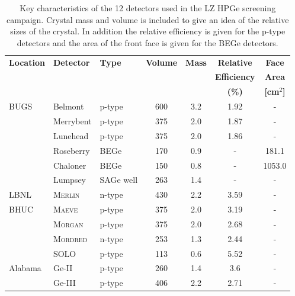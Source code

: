 \begin{table}[h]
\centering
\caption{Key characteristics of the 12 detectors used in the LZ HPGe screening campaign. Crystal mass and volume is included to give an idea of the relative sizes of the crystal. In addition the relative efficiency is given for the p-type detectors and the area of the front face is given for the BEGe detectors.}
    \label{tab:GeDetInf}
    \vspace{1mm}
    \renewcommand{\arraystretch}{1.1}
    \begin{tabular}{ lllcccc }
    \multirow{3}{*}{\textbf{Location}} & %
    \multirow{3}{*}{\textbf{Detector}} & %
    \multirow{3}{*}{\textbf{Type}} & %
    \multirow{2}{*}{\textbf{Volume}} & %
    \multirow{2}{*}{\textbf{Mass}} & %
    \textbf{Relative} & %
    \textbf{Face} %
    \\
    &
    & %
    & %
    \multirow{2}{*}{\textbf{[cm$^{3}$]}} & %
    \multirow{2}{*}{\textbf{[kg]}} & %
    \textbf{Efficiency} & %
    \textbf{Area} %
    \\
    &
    & %
    & %
    & %
    & %
    \textbf{(\%)} & %
    \textbf{[cm$^{2}$]} %
    \\
    \hline
    \hline

    \multirow{6}{*}{BUGS} & Belmont & p-type & 600 & 3.2 & 1.92 & - \\
    & Merrybent & p-type & 375 & 2.0 & 1.87 & - \\
    & Lunehead & p-type & 375 & 2.0 & 1.86 & - \\
    & Roseberry & BEGe & 170 & 0.9 & - & 181.1 \\
    & Chaloner & BEGe & 150 & 0.8 & - & 1053.0 \\
    & Lumpsey & SAGe well & 263 & 1.4 & - & - \\
    \hline
    LBNL & \textsc{Merlin} & n-type & 430 & 2.2 &3.59 & - \\
    \hline
    \multirow{4}{*}{BHUC}& \textsc{Maeve} & p-type & 375 & 2.0 &3.19 & - \\
    & \textsc{Morgan} & p-type & 375 & 2.0 & 2.68 & - \\
    & \textsc{Mordred} & n-type & 253 & 1.3 &2.44 & - \\
    & SOLO & p-type & 113 & 0.6 & 5.52 & - \\
    \hline
    \multirow{2}{*}{Alabama} & Ge-II  & p-type & 260 & 1.4 & 3.6  & - \\
    & Ge-III & p-type & 406 & 2.2 & 2.71 & - \\
    
    \bottomrule
\end{tabular}
\end{table}